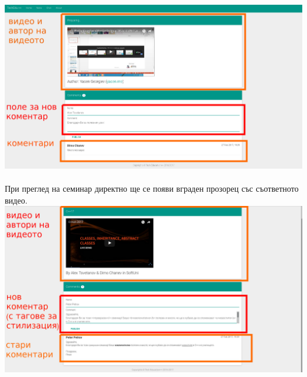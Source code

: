\documentclass[12pt]{article}
\begin{document}
	\includegraphics[width=1\textwidth]{video.png}\\
	\\При преглед на семинар директно ще се появи вграден прозорец със съответното видео.\\
	\includegraphics[width=1\textwidth]{seminar_video.png}\\
\end{document}
